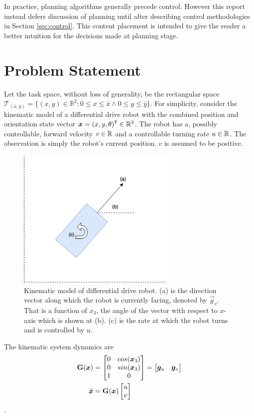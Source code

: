 \documentclass[oneside, 11pt]{book}
\begin{document}
In practice, planning algorithms generally precede control. However this report instead defers discussion of planning until after describing control methodologies in Section \ref{sec:control}. This content placement is intended to give the reader a better intuition for the decisions made at planning stage.

\section{Problem Statement}
Let the task space, without loss of generality, be the rectangular space  $\mathcal{T}_{(\bar{x},\bar{y})} = \{(x,y)\in\mathbb{R}^2 : 0 \leq x \leq \bar{x} \wedge 0 \leq y \leq \bar{y}\}$. For simplicity, consider the kinematic model of a differential drive robot with the combined position and orientation state vector $\bm{x}={(x,y,\theta)}^{\intercal}\in\mathbb{R}^3$. The robot has a, possibly controllable, forward velocity $v\in\mathbb{R}$ and a controllable turning rate $u\in\mathbb{R}$. The observation is simply the robot's current position. $v$ is assumed to be positive.
\begin{figure}[!htbp]
    \centering
    \includegraphics[width=3in]{images/diffdrive_kin_model.png}
    \caption{Kinematic model of differential drive robot. (a) is the direction vector along which the robot is currently facing, denoted by $\vec{g}_v$. That is a function of $x_3$, the angle of the vector with respect to $x$-axis which is shown at (b). (c) is the rate at which the robot turns and is controlled by $u$.}
    \label{fig:basic_kinematic_model}
\end{figure}
The kinematic system dynamics are
\begin{align}
    \mathbf{G}(\bm{x}) &=
        \begin{bmatrix}
            0 & cos(\bm{x}_3)\\
            0 & sin(\bm{x}_3)\\
            1 & 0
        \end{bmatrix}
        =
        \begin{bmatrix}
            \bm{g}_u & \bm{g}_v
        \end{bmatrix} \nonumber \\
    \dot{\bm{x}} &=
        \mathbf{G}(\bm{x})
        \begin{bmatrix} u \\ v \end{bmatrix}
    \label{eqn:basic_kinematic_model}
\end{align}.
\end{document}
